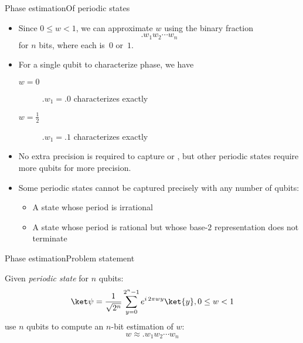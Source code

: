 \begin{frame}{Phase estimation}{Of periodic states}

\begin{itemize}[<+->]
    \item Since $0\leq w < 1$, we can approximate $w$ using the binary fraction
    \[ .w_{1}w_{2}\cdots w_{n}\]
    for $n$ bits, where each is~$0$ or~$1$.
    \item For a single qubit to characterize phase, we have
    \begin{description}
        \item[$w=0$]  $.w_{1}=.0$ characterizes \ket{+} exactly
        \item[$w=\frac{1}{2}$] $.w_{1}=.1$ characterizes \ket{-} exactly
    \end{description}
    \item No extra precision is required to capture \ket{+} or \ket{-}, but other periodic states require more qubits for more precision.
    \item Some periodic states cannot be captured precisely with any number of qubits:
    \begin{itemize}
        \item A state whose period is irrational
        \item A state whose period is rational but whose base-$2$ representation does not terminate
    \end{itemize}
\end{itemize}
    
\end{frame}

\begin{frame}{Phase estimation}{Problem statement}

Given \emph{periodic state} \QState{} for $n$ qubits: 
\[
\QState{} = \RootTwoN{n}\SumPH{y}{n} \ExpPhase{2\pi wy} \ket{y},  0 \leq w < 1
\]
use $n$ qubits to compute an $n$-bit estimation of $w$:
\[
w \approx .w_{1}w_{2}\cdots w_{n}
\]
    
\end{frame}

